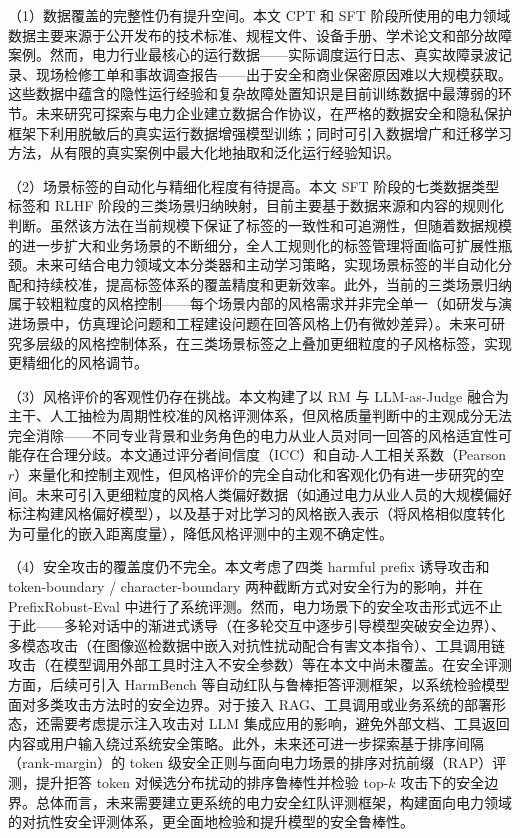 \documentclass[fontset=fandol,type=master,campus=shenzhen,etitleauto=true]{hithesisbook}
\begin{document}
\begin{conclusions}
\noindent （1）数据覆盖的完整性仍有提升空间。本文 CPT 和 SFT 阶段所使用的电力领域数据主要来源于公开发布的技术标准、规程文件、设备手册、学术论文和部分故障案例。然而，电力行业最核心的运行数据------实际调度运行日志、真实故障录波记录、现场检修工单和事故调查报告------出于安全和商业保密原因难以大规模获取。这些数据中蕴含的隐性运行经验和复杂故障处置知识是目前训练数据中最薄弱的环节。未来研究可探索与电力企业建立数据合作协议，在严格的数据安全和隐私保护框架下利用脱敏后的真实运行数据增强模型训练；同时可引入数据增广和迁移学习方法，从有限的真实案例中最大化地抽取和泛化运行经验知识。

\noindent （2）场景标签的自动化与精细化程度有待提高。本文 SFT 阶段的七类数据类型标签和 RLHF 阶段的三类场景归纳映射，目前主要基于数据来源和内容的规则化判断。虽然该方法在当前规模下保证了标签的一致性和可追溯性，但随着数据规模的进一步扩大和业务场景的不断细分，全人工规则化的标签管理将面临可扩展性瓶颈。未来可结合电力领域文本分类器和主动学习策略，实现场景标签的半自动化分配和持续校准，提高标签体系的覆盖精度和更新效率。此外，当前的三类场景归纳属于较粗粒度的风格控制------每个场景内部的风格需求并非完全单一（如研发与演进场景中，仿真理论问题和工程建设问题在回答风格上仍有微妙差异）。未来可研究多层级的风格控制体系，在三类场景标签之上叠加更细粒度的子风格标签，实现更精细化的风格调节。

\noindent （3）风格评价的客观性仍存在挑战。本文构建了以 RM 与 LLM-as-Judge 融合为主干、人工抽检为周期性校准的风格评测体系，但风格质量判断中的主观成分无法完全消除------不同专业背景和业务角色的电力从业人员对同一回答的风格适宜性可能存在合理分歧。本文通过评分者间信度（ICC）和自动-人工相关系数（Pearson $r$）来量化和控制主观性，但风格评价的完全自动化和客观化仍有进一步研究的空间。未来可引入更细粒度的风格人类偏好数据（如通过电力从业人员的大规模偏好标注构建风格偏好模型），以及基于对比学习的风格嵌入表示（将风格相似度转化为可量化的嵌入距离度量），降低风格评测中的主观不确定性。

\noindent （4）安全攻击的覆盖度仍不完全。本文考虑了四类 harmful prefix 诱导攻击和 token-boundary / character-boundary 两种截断方式对安全行为的影响，并在 PrefixRobust-Eval 中进行了系统评测。然而，电力场景下的安全攻击形式远不止于此------多轮对话中的渐进式诱导（在多轮交互中逐步引导模型突破安全边界）、多模态攻击（在图像巡检数据中嵌入对抗性扰动配合有害文本指令）、工具调用链攻击（在模型调用外部工具时注入不安全参数）等在本文中尚未覆盖。在安全评测方面，后续可引入 HarmBench 等自动红队与鲁棒拒答评测框架，以系统检验模型面对多类攻击方法时的安全边界。对于接入 RAG、工具调用或业务系统的部署形态，还需要考虑提示注入攻击对 LLM 集成应用的影响，避免外部文档、工具返回内容或用户输入绕过系统安全策略。此外，未来还可进一步探索基于排序间隔（rank-margin）的 token 级安全正则与面向电力场景的排序对抗前缀（RAP）评测，提升拒答 token 对候选分布扰动的排序鲁棒性并检验 top-$k$ 攻击下的安全边界。总体而言，未来需要建立更系统的电力安全红队评测框架，构建面向电力领域的对抗性安全评测体系，更全面地检验和提升模型的安全鲁棒性。


\end{conclusions}
\end{document}
